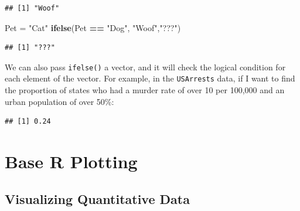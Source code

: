 \documentclass[
]{book}
\newenvironment{Shaded}{\begin{snugshade}}{\end{snugshade}}
\newcommand{\DecValTok}[1]{\textcolor[rgb]{0.00,0.00,0.81}{#1}}
\newcommand{\KeywordTok}[1]{\textcolor[rgb]{0.13,0.29,0.53}{\textbf{#1}}}
\newcommand{\NormalTok}[1]{#1}
\newcommand{\OperatorTok}[1]{\textcolor[rgb]{0.81,0.36,0.00}{\textbf{#1}}}
\newcommand{\OtherTok}[1]{\textcolor[rgb]{0.56,0.35,0.01}{#1}}
\newcommand{\StringTok}[1]{\textcolor[rgb]{0.31,0.60,0.02}{#1}}
\begin{document}
\begin{verbatim}
## [1] "Woof"
\end{verbatim}

\begin{Shaded}
\begin{Highlighting}[]
\NormalTok{Pet =}\StringTok{ "Cat"}
\KeywordTok{ifelse}\NormalTok{(Pet }\OperatorTok{==}\StringTok{ "Dog"}\NormalTok{, }\StringTok{"Woof"}\NormalTok{,}\StringTok{"???"}\NormalTok{)}
\end{Highlighting}
\end{Shaded}

\begin{verbatim}
## [1] "???"
\end{verbatim}

We can also pass \texttt{ifelse()} a vector, and it will check the logical condition for each element of the vector. For example, in the \texttt{USArrests} data, if I want to find the proportion of states who had a murder rate of over 10 per 100,000 and an urban population of
over 50\%:

\begin{Shaded}
\end{Shaded}

\begin{verbatim}
## [1] 0.24
\end{verbatim}

\hypertarget{base-r-plotting}{%
\chapter{Base R Plotting}\label{base-r-plotting}}

\hypertarget{visualizing-quantitative-data}{%
\section{Visualizing Quantitative Data}\label{visualizing-quantitative-data}}
\end{document}
